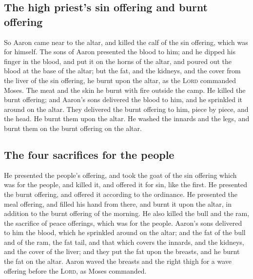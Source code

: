 \hypertarget{the-high-priests-sin-offering-and-burnt-offering}{%
\subsection{The high priest's sin offering and burnt
offering}\label{the-high-priests-sin-offering-and-burnt-offering}}

 So Aaron came near to the altar, and killed the calf of
the sin offering, which was for himself.  The sons of
Aaron presented the blood to him; and he dipped his finger in the blood,
and put it on the horns of the altar, and poured out the blood at the
base of the altar;  but the fat, and the kidneys, and the
cover from the liver of the sin offering, he burnt upon the altar, as
the \textsc{Lord} commanded Moses.  The meat and the skin
he burnt with fire outside the camp.  He killed the burnt
offering; and Aaron's sons delivered the blood to him, and he sprinkled
it around on the altar.  They delivered the burnt
offering to him, piece by piece, and the head. He burnt them upon the
altar.  He washed the innards and the legs, and burnt
them on the burnt offering on the altar.

\hypertarget{the-four-sacrifices-for-the-people}{%
\subsection{The four sacrifices for the
people}\label{the-four-sacrifices-for-the-people}}

 He presented the people's offering, and took the goat of
the sin offering which was for the people, and killed it, and offered it
for sin, like the first.  He presented the burnt
offering, and offered it according to the ordinance.  He
presented the meal offering, and filled his hand from there, and burnt
it upon the altar, in addition to the burnt offering of the morning.
 He also killed the bull and the ram, the sacrifice of
peace offerings, which was for the people. Aaron's sons delivered to him
the blood, which he sprinkled around on the altar;  and
the fat of the bull and of the ram, the fat tail, and that which covers
the innards, and the kidneys, and the cover of the liver;
 and they put the fat upon the breasts, and he burnt the
fat on the altar.  Aaron waved the breasts and the right
thigh for a wave offering before the \textsc{Lord}, as Moses commanded.

